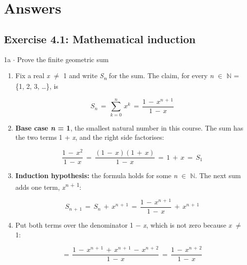 \documentclass[11pt]{article}
\begin{document}
\clearpage
\section{Answers}
\begin{keepsection}\subsection{Exercise 4.1: Mathematical induction}

\begin{workedbox}{1a \ensuremath{\cdot} Prove the finite geometric sum}
\begin{enumerate}
\item {}
Fix a real \textit{x} \ensuremath{\neq} 1 and write \textit{S}\textsubscript{\textit{n}} for the sum. The claim, for every \textit{n} \ensuremath{\in} \ensuremath{\mathbb{N}} = \{1, 2, 3, …\}, is

\begin{equation*}{S}_{{n}}\, =\, \sum_{{k}=0}^{{n}} \, {x}^{{k}}\, =\, \dfrac{1\, -\, {x}^{{n}\, +\, 1}}{1\, -\, {x}}\end{equation*}
\item {}
\textbf{Base case \textit{n} = 1}, the smallest natural number in this course. The sum has the two terms 1 + \textit{x}, and the right side factorises:

\begin{equation*}\dfrac{1\, -\, {x}^{2}}{1\, -\, {x}}\, =\, \dfrac{(1\, -\, {x})(1\, +\, {x})}{1\, -\, {x}}\, =\, 1\, +\, {x}\, =\, {S}_{1}\end{equation*}
\item {}
\textbf{Induction hypothesis:} the formula holds for some \textit{n} \ensuremath{\in} \ensuremath{\mathbb{N}}. The next sum adds one term, \textit{x}\textsuperscript{\textit{n} + 1}:

\begin{equation*}{S}_{{n}\, +\, 1}\, =\, {S}_{{n}}\, +\, {x}^{{n}\, +\, 1}\, =\, \dfrac{1\, -\, {x}^{{n}\, +\, 1}}{1\, -\, {x}}\, +\, {x}^{{n}\, +\, 1}\end{equation*}
\item {}
Put both terms over the denominator 1 \ensuremath{-} \textit{x}, which is not zero because \textit{x} \ensuremath{\neq} 1:

\begin{equation*}=\, \dfrac{1\, -\, {x}^{{n}\, +\, 1}\, +\, {x}^{{n}\, +\, 1}\, -\, {x}^{{n}\, +\, 2}}{1\, -\, {x}}\, =\, \dfrac{1\, -\, {x}^{{n}\, +\, 2}}{1\, -\, {x}}\end{equation*}


\end{enumerate}
\end{workedbox}
\end{keepsection}
\end{document}
